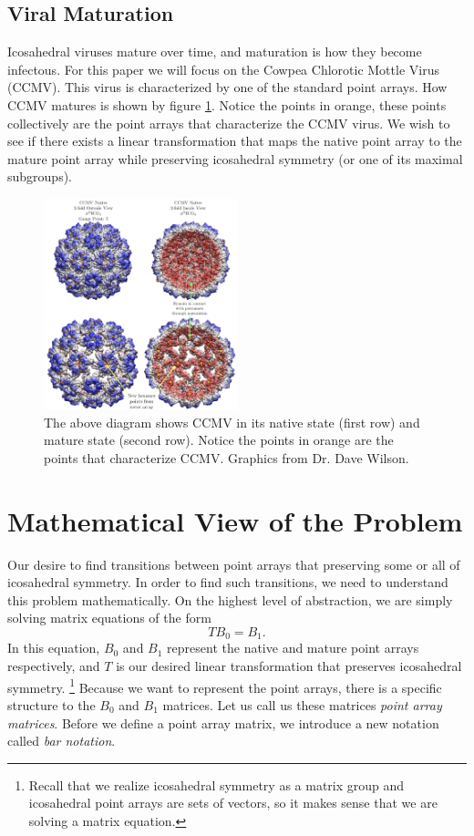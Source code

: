 \documentclass[a4paper,10pt]{article}
\let\oldfootnote\footnote
\renewcommand{\footnote}{\unskip\oldfootnote}
\theoremstyle{plain}
\theoremstyle{definition}
\theoremstyle{remark}
\renewcommand{\vec}[1]{\mathbf{#1}}
\begin{document}
\subsection{Viral Maturation}
Icosahedral viruses mature over time, and maturation is how they become infectous.
For this paper we will focus on the Cowpea Chlorotic Mottle Virus (CCMV).
This virus is characterized by one of the standard point arrays.
How CCMV matures is shown by figure \ref{fig:CCMV_maturation}.
Notice the points in orange, these points collectively are the point arrays that characterize the CCMV virus.
We wish to see if there exists a linear transformation that maps the native point array to the mature point array while preserving icosahedral symmetry (or one of its maximal subgroups).

\begin{figure}[!h]
	\centering
	\captionsetup{width=0.5\textwidth}
	\includegraphics[width=0.5\textwidth]{images/CCMV_maturation.png}
	\caption{
		The above diagram shows CCMV in its native state (first row) and mature state (second row). 
		Notice the points in orange are the points that characterize CCMV.
		Graphics from Dr. Dave Wilson.
	}
	\label{fig:CCMV_maturation}
\end{figure}

\section{Mathematical View of the Problem}
Our desire to find transitions between point arrays that preserving some or all of icosahedral symmetry.
In order to find such transitions, we need to understand this problem mathematically.
On the highest level of abstraction, we are simply solving matrix equations of the form \[TB_0 = B_1.\]
In this equation, \(B_0\) and \(B_1\) represent the native and mature point arrays respectively, and \(T\) is our desired linear transformation that preserves icosahedral symmetry.
\footnote{Recall that we realize icosahedral symmetry as a matrix group and icosahedral point arrays are sets of vectors, so it makes sense that we are solving a matrix equation.}
Because we want to represent the point arrays, there is a specific structure to the \( B_0 \) and \( B_1 \) matrices.
Let us call us these matrices \emph{point array matrices}.
Before we define a point array matrix, we introduce a new notation called \emph{bar notation}.
\newcommand{\icobar}[1]{\overline{\vec{#1}}}
\end{document}
